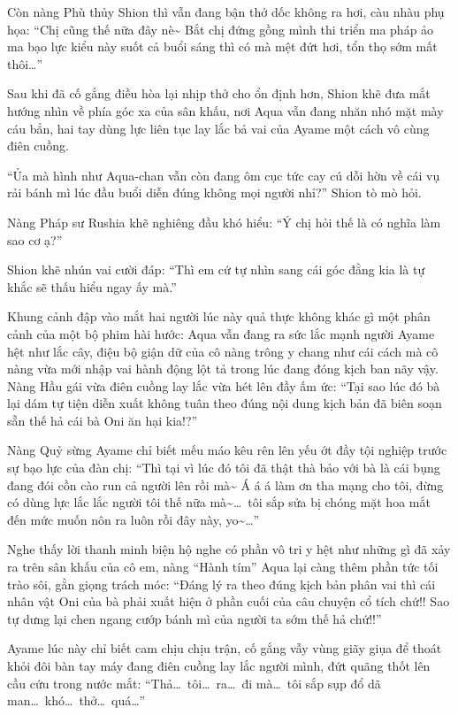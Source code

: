\documentclass[../main.tex]{subfiles}
\begin{document}
Còn nàng Phù thủy Shion thì vẫn đang bận thở dốc không ra hơi, càu nhàu phụ họa: ``Chị cũng thế nữa đây nè\~{} Bắt chị đứng gồng mình thi triển ma pháp ảo ma bạo lực kiểu này suốt cả buổi sáng thì có mà mệt đứt hơi, tổn thọ sớm mất thôi\dots''

Sau khi đã cố gắng điều hòa lại nhịp thở cho ổn định hơn, Shion khẽ đưa mắt hướng nhìn về phía góc xa của sân khấu, nơi Aqua vẫn đang nhăn nhó mặt mày cáu bẳn, hai tay dùng lực liên tục lay lắc bả vai của Ayame một cách vô cùng điên cuồng.

``Ủa mà hình như Aqua-chan vẫn còn đang ôm cục tức cay cú dỗi hờn về cái vụ rải bánh mì lúc đầu buổi diễn đúng không mọi người nhỉ?'' Shion tò mò hỏi.

Nàng Pháp sư Rushia khẽ nghiêng đầu khó hiểu: ``Ý chị hỏi thế là có nghĩa làm sao cơ ạ?''

Shion khẽ nhún vai cười đáp: ``Thì em cứ tự nhìn sang cái góc đằng kia là tự khắc sẽ thấu hiểu ngay ấy mà.''

Khung cảnh đập vào mắt hai người lúc này quả thực không khác gì một phân cảnh của một bộ phim hài hước: Aqua vẫn đang ra sức lắc mạnh người Ayame hệt như lắc cây, điệu bộ giận dữ của cô nàng trông y chang như cái cách mà cô nàng vừa mới nhập vai hành động lột tả trong lúc đang đóng kịch ban nãy vậy. Nàng Hầu gái vừa điên cuồng lay lắc vừa hét lên đầy ấm ức: ``Tại sao lúc đó bà lại dám tự tiện diễn xuất không tuân theo đúng nội dung kịch bản đã biên soạn sẵn thế hả cái bà Oni ăn hại kia!?''

Nàng Quỷ sừng Ayame chỉ biết mếu máo kêu rên lên yếu ớt đầy tội nghiệp trước sự bạo lực của đàn chị: ``Thì tại vì lúc đó tôi đã thật thà bảo với bà là cái bụng đang đói cồn cào run cả người lên rồi mà\~{} Á á á làm ơn tha mạng cho tôi, đừng có dùng lực lắc lắc người tôi thế nữa mà\~{}\dots\ tôi sắp sửa bị chóng mặt hoa mắt đến mức muốn nôn ra luôn rồi đây này, yo\~{}\dots''

Nghe thấy lời thanh minh biện hộ nghe có phần vô tri y hệt như những gì đã xảy ra trên sân khấu của cô em, nàng ``Hành tím'' Aqua lại càng thêm phần tức tối trào sôi, gằn giọng trách móc: ``Đáng lý ra theo đúng kịch bản phân vai thì cái nhân vật Oni của bà phải xuất hiện ở phần cuối của câu chuyện cổ tích chứ!! Sao tự dưng lại chen ngang cướp bánh mì của người ta sớm thế hả chứ!!''

Ayame lúc này chỉ biết cam chịu chịu trận, cố gắng vẫy vùng giãy giụa để thoát khỏi đôi bàn tay máy đang điên cuồng lay lắc người mình, đứt quãng thốt lên cầu cứu trong nước mắt: ``Thả\dots\ tôi\dots\ ra\dots\ đi mà\dots\ tôi sắp sụp đổ dã man\dots\ khó\dots\ thở\dots\ quá\dots''
\end{document}
